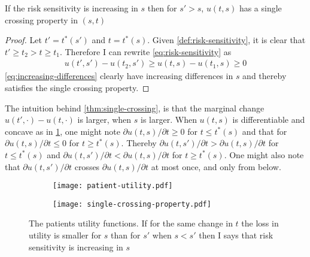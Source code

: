 \begin{theorem}\label{thm:single-crossing}
If the risk sensitivity is increasing in $s$  then for $s'>s$, $u(t,s)$ has a single crossing property in $(s,t)$
\end{theorem}

\begin{proof}
Let $t'=t^{*}(s')$ and $t=t^{*}(s)$. Given \cref{def:risk-sensitivity}, it is clear that $t'\ge t_{2}>t\ge t_{1}$. Therefore I can rewrite \cref{eq:risk-sensitivity} as
\begin{align}
  u(t',s')-u(t_{2},s')\ge u(t,s)-u(t_{1},s)\ge0\label{eq:increasing-differences}
\end{align}
\cref{eq:increasing-differences} clearly have increasing differences in $s$ and thereby satisfies the single crossing property.
\end{proof}

The intuition behind \cref{thm:single-crossing}, is that the marginal change $u(t',\cdot)-u(t,\cdot)$ is larger, when $s$ is larger. When $u(t,s)$ is differentiable and concave as in \cref{fig:The-patients-utility}, one might note $\partial u(t,s)/\partial t\ge0$ for $t\le t^{*}(s)$ and that for $\partial u(t,s)/\partial t\le0$ for $t\ge t^{*}(s)$. Thereby $\partial u(t,s')/\partial t>\partial u(t,s)/\partial t$ for $t\le t^{*}(s)$ and $\partial u(t,s')/\partial t<\partial u(t,s)/\partial t$ for $t\ge t^{*}(s)$. One might also note that $\partial u(t,s')/\partial t$ crosses $\partial u(t,s)/\partial t$ at most once, and only from below.

\begin{figure}
     \centering
    \begin{subfigure}[b]{0.49\textwidth}
		\texttt{[image: patient-utility.pdf]}
	\end{subfigure}
    \begin{subfigure}[b]{0.49\textwidth}
		\texttt{[image: single-crossing-property.pdf]}
	\end{subfigure}
\caption{\label{fig:The-patients-utility}The patients utility functions. If for the same change in $t$ the loss in utility is smaller for $s$ than for $s'$  when $s<s'$  then I says that risk sensitivity is increasing in $s$ }
\end{figure}

